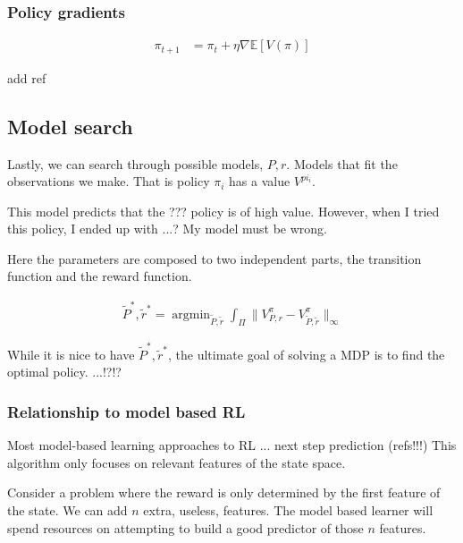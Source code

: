 \subsubsection{Policy gradients}

\begin{align}
\pi_{t+1} &= \pi_t + \eta \nabla \mathbb E [V(\pi)]
\end{align}

add ref


\subsection{Model search}

Lastly, we can search through possible models, $P, r$. Models that fit the
observations we make. That is policy $\pi_i$ has a value $V^{pi_i}$.

\begin{displayquote}
  This model predicts that the ??? policy is of high value.
  However, when I tried this policy, I ended up with ...?
  My model must be wrong.
\end{displayquote}

Here the parameters are composed to two independent parts, the transition function
and the reward function.

\begin{align}
\tilde P^{* }, \tilde r^{* } = \mathop{\text{argmin}}_{\tilde P, \tilde r} \int_{\Pi} \parallel V^{\pi}_{P, r} -V^{\pi}_{\tilde P, \tilde r} \parallel_\infty
\end{align}

While it is nice to have $\tilde P^{* }, \tilde r^{* }$, the ultimate goal of
solving a MDP is to find the optimal policy. ...!?!?

\subsubsection{Relationship to model based RL}

Most model-based learning approaches to RL ... next step prediction (refs!!!)
This algorithm only focuses on relevant features of the state space.

Consider a problem where the reward is only determined by the first feature of the state. We can add $n$ extra, useless, features.
The model based learner will spend resources on attempting to build a good predictor of those $n$ features.

